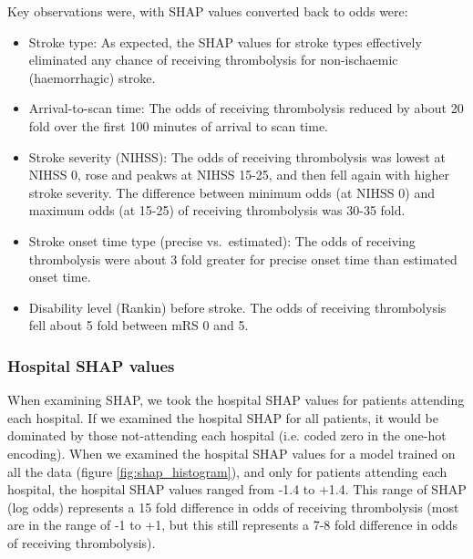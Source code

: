 Key observations were, with SHAP values converted back to odds were:

\begin{itemize}
\item Stroke type: As expected, the SHAP values for stroke types effectively
  eliminated any chance of receiving thrombolysis for non-ischaemic
  (haemorrhagic) stroke.
\item Arrival-to-scan time: The odds of receiving thrombolysis reduced by
  about 20 fold over the first 100 minutes of arrival to scan time.
\item Stroke severity (NIHSS): The odds of receiving thrombolysis was lowest
  at NIHSS 0, rose and peakws at NIHSS 15-25, and then fell again with
  higher stroke severity. The difference between minimum odds (at NIHSS
  0) and maximum odds (at 15-25) of receiving thrombolysis was 30-35
  fold.
\item Stroke onset time type (precise vs.~estimated): The odds of receiving
  thrombolysis were about 3 fold greater for precise onset time than
  estimated onset time.
\item Disability level (Rankin) before stroke. The odds of receiving
  thrombolysis fell about 5 fold between mRS 0 and 5.
\end{itemize}


\subsubsection{Hospital SHAP values}


When examining SHAP, we took the hospital SHAP values for patients attending each hospital. If we examined the hospital SHAP for all patients, it would be dominated by those not-attending each hospital (i.e. coded zero in the one-hot encoding). When we examined the hospital SHAP values for a model trained on all the data (figure \ref{fig:shap_histogram}), and only for patients attending each hospital, the hospital SHAP values ranged from -1.4 to +1.4. This range of SHAP (log odds) represents a 15 fold difference in odds of receiving thrombolysis (most are in the range of -1 to +1, but this still represents a 7-8 fold difference in odds of receiving thrombolysis). 

